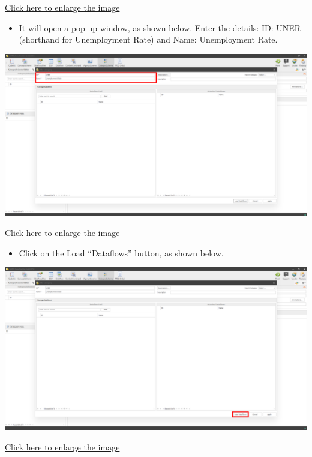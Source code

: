 \documentclass[
]{book}
\providecommand{\tightlist}{%
  \setlength{\itemsep}{0pt}\setlength{\parskip}{0pt}}
\begin{document}
\href{images/image162.png}{Click here to enlarge the image}

\begin{itemize}
\tightlist
\item
  It will open a pop-up window, as shown below. Enter the details: ID: UNER (shorthand for Unemployment Rate) and Name: Unemployment Rate.
\end{itemize}

\begin{center}\includegraphics[width=1\linewidth]{./images/image164} \end{center}

\href{images/image164.png}{Click here to enlarge the image}

\begin{itemize}
\tightlist
\item
  Click on the Load ``Dataflows'' button, as shown below.
\end{itemize}

\begin{center}\includegraphics[width=1\linewidth]{./images/image166} \end{center}

\href{images/image166.png}{Click here to enlarge the image}
\end{document}

